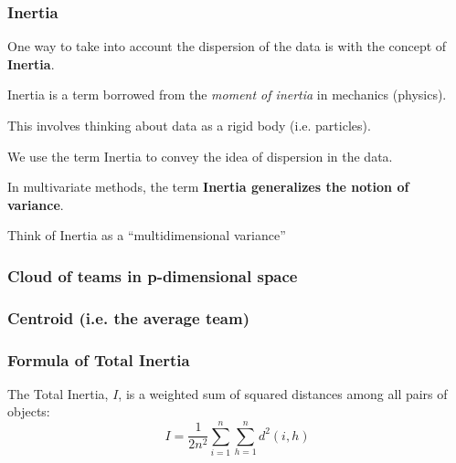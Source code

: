 \documentclass[12pt]{beamer}\usepackage[]{graphicx}\usepackage[]{color}
\begin{document}

\begin{frame}
\frametitle{Inertia}

One way to take into account the dispersion of the data is with the concept of 
{\hilit \textbf{Inertia}}.

\bbi
  \item Inertia is a term borrowed from the \textit{moment of inertia} in mechanics (physics).
  \item This involves thinking about data as a rigid body (i.e. particles).
  \item We use the term Inertia to convey the idea of dispersion in the data.
  \item In multivariate methods, the term \textbf{\hilit Inertia generalizes the notion of variance}.
  \item Think of Inertia as a ``multidimensional variance''
\ei

\end{frame}


\begin{frame}
\frametitle{Cloud of teams in p-dimensional space}
\begin{center}
\end{center}
\end{frame}


\begin{frame}
\frametitle{Centroid (i.e. the average team)}
\begin{center}
\end{center}
\end{frame}


\begin{frame}
\frametitle{Formula of Total Inertia}

The Total Inertia, $I$, is a weighted sum of squared distances among all pairs of objects:
$$
I = \frac{1}{2n^2} \sum_{i = 1}^{n}{\sum_{h = 1}^{n}{d^2(i,h)}}
$$

\end{frame}

\end{document}

